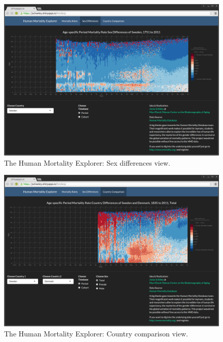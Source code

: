 \documentclass[
  12pt
]{scrartcl}
\begin{document}
\begin{figure}[ht!]
  \includegraphics[width = \linewidth]{./fig/hmd_screen_mx_sex_diff.png}
  \caption{The Human Mortality Explorer: Sex differences view.}
\end{figure}

\begin{figure}[ht!]
  \includegraphics[width = \linewidth]{./fig/hmd_screen_mx_cntry_diff.png}
  \caption{The Human Mortality Explorer: Country comparison view.}
\end{figure}

\clearpage


\sloppy
\printbibliography




\end{document}
